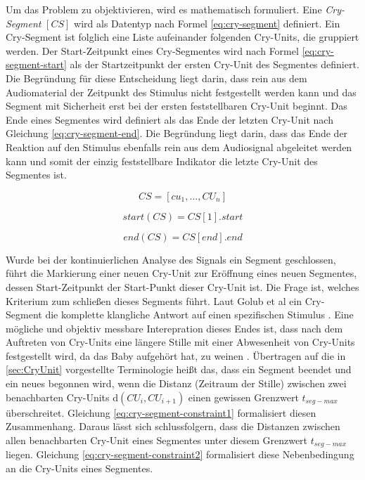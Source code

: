 Um das Problem zu objektivieren, wird es mathematisch formuliert. 
Eine \emph{Cry-Segment} $[CS]$ wird als Datentyp nach Formel \ref{eq:cry-segment} definiert. Ein Cry-Segment ist folglich eine Liste aufeinander folgenden Cry-Units, die gruppiert werden. Der Start-Zeitpunkt eines Cry-Segmentes wird nach Formel \ref{eq:cry-segment-start} als der Startzeitpunkt der ersten Cry-Unit des Segmentes definiert. Die Begründung für diese Entscheidung liegt darin, dass rein aus dem Audiomaterial der Zeitpunkt des Stimulus nicht festgestellt werden kann und das Segment mit Sicherheit erst bei der ersten feststellbaren Cry-Unit beginnt. Das Ende eines Segmentes wird definiert als das Ende der letzten Cry-Unit nach Gleichung \ref{eq:cry-segment-end}. Die Begründung liegt darin, dass das Ende der Reaktion auf den Stimulus ebenfalls rein aus dem Audiosignal abgeleitet werden kann und somit der einzig feststellbare Indikator die letzte Cry-Unit des Segmentes ist. 

\begin{equation}
CS = [cu_1 ,  ... ,  CU_n]
\label{eq:cry-segment}
\end{equation}

\begin{equation}
start(CS) = CS[1].start
\label{eq:cry-segment-start}
\end{equation}

\begin{equation}
end(CS) = CS[end].end
\label{eq:cry-segment-end}
\end{equation}

Wurde bei der kontinuierlichen Analyse des Signals ein Segment geschlossen, führt die Markierung einer neuen Cry-Unit zur Eröffnung eines neuen Segmentes, dessen Start-Zeitpunkt der Start-Punkt dieser Cry-Unit ist. Die Frage ist, welches Kriterium zum schließen dieses Segments führt. Laut Golub et al \cite{cryModel} ein Cry-Segment \glqq die komplette klangliche Antwort auf einen spezifischen Stimulus \grqq. Eine mögliche und objektiv messbare Interepration dieses Endes ist, dass nach dem Auftreten von Cry-Units eine längere Stille mit einer  Abwesenheit von Cry-Units festgestellt wird, da das Baby \glqq aufgehört hat, zu weinen \grqq. Übertragen auf die in \ref{sec:CryUnit} vorgestellte Terminologie heißt das, dass ein Segment beendet und ein neues begonnen wird, wenn die Distanz (Zeitraum der Stille) zwischen zwei benachbarten Cry-Units d$(CU_{i}, CU_{i+1})$ einen gewissen Grenzwert $t_{seg-max}$ überschreitet. Gleichung \ref{eq:cry-segment-constraint1} formalisiert diesen Zusammenhang. Daraus lässt sich schlussfolgern, dass die Distanzen zwischen allen benachbarten Cry-Unit eines Segmentes unter diesem Grenzwert $t_{seg-max}$ liegen. Gleichung \ref{eq:cry-segment-constraint2} formalisiert diese Nebenbedingung an die Cry-Units eines Segmentes. 


